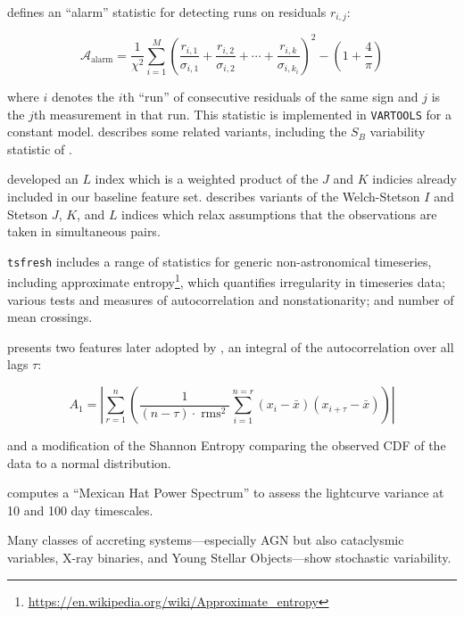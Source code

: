 \documentclass[DM,authoryear,toc]{lsstdoc}
\begin{document}
\citet{Tamuz:06:EBfitting} defines an ``alarm'' statistic for detecting runs on residuals $r_{i,j}$:

\begin{equation}
\mathcal{A}_{\mathrm{alarm}}=\frac{1}{\chi^{2}} \sum_{i=1}^{M}\left(\frac{r_{i, 1}}{\sigma_{i, 1}}+\frac{r_{i, 2}}{\sigma_{i, 2}}+\cdots+\frac{r_{i, k}}{\sigma_{i, k_{i}}}\right)^{2}-\left(1+\frac{4}{\pi}\right)
\end{equation}

where $i$ denotes the $i$th ``run'' of consecutive residuals of the same sign and $j$ is the $j$th measurement in that run.
This statistic is implemented in \texttt{VARTOOLS} for a constant model.
\citet{Sokolovsky:17:VariabilityDetection} describes some related variants, including the $S_B$ variability statistic of \citet{ArellanoFerro:12:RRLyrDetection}.

\citet{1996PASP..108..851S} developed an $L$ index which is a weighted product of the $J$ and $K$ indicies already included in our baseline feature set.
\citet{Sokolovsky:17:VariabilityDetection} describes variants of the Welch-Stetson $I$ \citet{Welch:93:WelchStetson} and Stetson $J$, $K$, and $L$ indices which relax assumptions that the observations are taken in simultaneous pairs.

\texttt{tsfresh} includes a range of statistics for generic non-astronomical timeseries, including approximate entropy\footnote{\url{https://en.wikipedia.org/wiki/Approximate_entropy}}, which quantifies irregularity in timeseries data; various tests and measures of autocorrelation and nonstationarity; and number of mean crossings.

\citet{Mislis:16:SIDRA} presents two features later adopted by \citet{Narayan:18:ANTARES}, an integral of the autocorrelation over all lags $\tau$:

\begin{equation}
  A_{1}=\left|\sum_{r=1}^{n}\left(\frac{1}{(n-\tau) \cdot \operatorname{rms}^{2}} \sum_{i=1}^{n=r}\left(x_{i}-\bar{x}\right)\left(x_{i+\tau}-\bar{x}\right)\right)\right|
\end{equation}

and a modification of the Shannon Entropy comparing the observed CDF of the data to a normal distribution.

\citet{Sanchez-Saez:21:AlertClassification} computes a ``Mexican Hat Power Spectrum'' to assess the lightcurve variance at 10 and 100 day timescales.

Many classes of accreting systems---especially AGN but also cataclysmic variables, X-ray binaries, and Young Stellar Objects---show stochastic variability.
\end{document}
